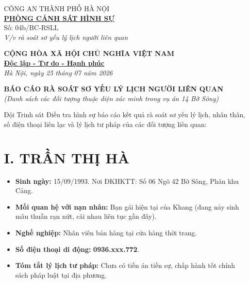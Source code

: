 \documentclass[12pt,a4paper]{article}
\begin{document}
\noindent
\begin{minipage}[t]{0.45\textwidth}
    \begin{center}
        \small
        CÔNG AN THÀNH PHỐ HÀ NỘI\\
        \textbf{\underline{PHÒNG CẢNH SÁT HÌNH SỰ}}\\[0.1cm]
        Số: 04b/BC-RSLL\\
        \textit{V/v rà soát sơ yếu lý lịch người liên quan}
    \end{center}
\end{minipage}
\hfill
\begin{minipage}[t]{0.52\textwidth}
    \begin{center}
        \small
        \textbf{CỘNG HÒA XÃ HỘI CHỦ NGHĨA VIỆT NAM}\\
        \textbf{\underline{Độc lập - Tự do - Hạnh phúc}}\\[0.1cm]
        \textit{Hà Nội, ngày 25 tháng 07 năm 2026}
    \end{center}
\end{minipage}

\vspace{0.6cm}

\begin{center}
    \textbf{\large BÁO CÁO RÀ SOÁT SƠ YẾU LÝ LỊCH NGƯỜI LIÊN QUAN}\\
    \textit{(Danh sách các đối tượng thuộc diện xác minh trong vụ án 14 Bờ Sông)}
\end{center}

\vspace{0.3cm}

\noindent Đội Trinh sát Điều tra hình sự báo cáo kết quả rà soát sơ yếu lý lịch, nhân thân, số điện thoại liên lạc và lý lịch tư pháp của các đối tượng liên quan:

\section*{I. TRẦN THỊ HÀ}
\begin{itemize}[leftmargin=1.5cm]
    \item \textbf{Sinh ngày:} 15/09/1993. Nơi ĐKHKTT: Số 06 Ngõ 42 Bờ Sông, Phân khu Cảng.
    \item \textbf{Mối quan hệ với nạn nhân:} Bạn gái hiện tại của Khang (đang nảy sinh mâu thuẫn rạn nứt, cãi nhau liên tục gần đây).
    \item \textbf{Nghề nghiệp:} Nhân viên bán hàng tại cửa hàng thời trang.
    \item \textbf{Số điện thoại di động:} \textbf{0936.xxx.772}.
    \item \textbf{Tóm tắt lý lịch tư pháp:} Chưa có tiền án tiền sự, chấp hành tốt chính sách pháp luật tại địa phương.
\end{itemize}
\end{document}
